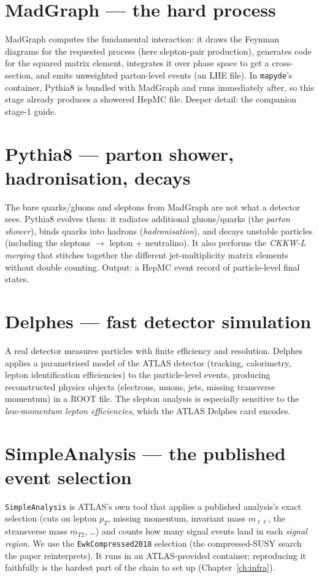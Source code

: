 \documentclass[11pt,oneside]{report}
\newcommand{\code}[1]{\texttt{#1}}
\begin{document}
\section{MadGraph --- the hard process}
MadGraph computes the fundamental interaction: it draws the Feynman diagrams for the requested
process (here slepton-pair production), generates code for the squared matrix element, integrates
it over phase space to get a cross-section, and emits unweighted parton-level events (an LHE file).
In \code{mapyde}'s container, Pythia8 is bundled with MadGraph and runs immediately after, so this
stage already produces a showered HepMC file. Deeper detail: the companion stage-1 guide.

\section{Pythia8 --- parton shower, hadronisation, decays}
The bare quarks/gluons and sleptons from MadGraph are not what a detector sees. Pythia8 evolves
them: it radiates additional gluons/quarks (the \emph{parton shower}), binds quarks into hadrons
(\emph{hadronisation}), and decays unstable particles (including the sleptons $\to$ lepton +
neutralino). It also performs the \emph{CKKW-L merging} that stitches together the different
jet-multiplicity matrix elements without double counting. Output: a HepMC event record of
particle-level final states.

\section{Delphes --- fast detector simulation}
A real detector measures particles with finite efficiency and resolution. Delphes applies a
parametrised model of the ATLAS detector (tracking, calorimetry, lepton identification efficiencies)
to the particle-level events, producing reconstructed physics objects (electrons, muons, jets,
missing transverse momentum) in a ROOT file. The slepton analysis is especially sensitive to the
\emph{low-momentum lepton efficiencies}, which the ATLAS Delphes card encodes.

\section{SimpleAnalysis --- the published event selection}
\code{SimpleAnalysis} is ATLAS's own tool that applies a published analysis's exact selection
(cuts on lepton $p_T$, missing momentum, invariant mass $m_{\ell\ell}$, the stransverse mass
$m_{T2}$, \ldots) and counts how many signal events land in each \emph{signal region}. We use the
\code{EwkCompressed2018} selection (the compressed-SUSY search the paper reinterprets). It runs in
an ATLAS-provided container; reproducing it faithfully is the hardest part of the chain to set up
(Chapter~\ref{ch:infra}).
\end{document}
